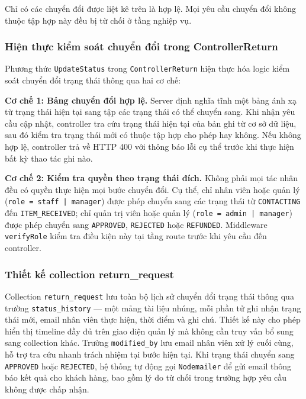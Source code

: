 \documentclass[../DoAn.tex]{subfiles}
\begin{document}
Chỉ có các chuyển đổi được liệt kê trên là hợp lệ. Mọi yêu cầu chuyển đổi
không thuộc tập hợp này đều bị từ chối ở tầng nghiệp vụ.

\subsubsection*{Hiện thực kiểm soát chuyển đổi trong ControllerReturn}
Phương thức \texttt{UpdateStatus} trong \texttt{ControllerReturn} hiện thực
hóa logic kiểm soát chuyển đổi trạng thái thông qua hai cơ chế:

\textbf{Cơ chế 1: Bảng chuyển đổi hợp lệ.} Server định nghĩa tĩnh một bảng
ánh xạ từ trạng thái hiện tại sang tập các trạng thái có thể chuyển sang.
Khi nhận yêu cầu cập nhật, controller tra cứu trạng thái hiện tại của bản ghi
từ cơ sở dữ liệu, sau đó kiểm tra trạng thái mới có thuộc tập hợp cho phép
hay không. Nếu không hợp lệ, controller trả về HTTP 400 với thông báo lỗi cụ
thể trước khi thực hiện bất kỳ thao tác ghi nào.

\textbf{Cơ chế 2: Kiểm tra quyền theo trạng thái đích.} Không phải mọi tác
nhân đều có quyền thực hiện mọi bước chuyển đổi. Cụ thể, chỉ nhân viên hoặc
quản lý \break (\texttt{role = staff | manager}) được phép chuyển sang các trạng thái
từ \break \texttt{CONTACTING} đến \texttt{ITEM\_RECEIVED}; chỉ quản trị viên hoặc
quản lý 
\break (\texttt{role = admin | manager}) được phép chuyển sang \texttt{APPROVED}, \break
\texttt{REJECTED} hoặc \texttt{REFUNDED}. Middleware \texttt{verifyRole} kiểm
tra điều kiện này tại tầng route trước khi yêu cầu đến controller.

\subsubsection*{Thiết kế collection return\_request}

Collection \texttt{return\_request} lưu toàn bộ lịch sử chuyển đổi trạng thái
thông qua trường \texttt{status\_history} --- một mảng tài liệu nhúng, mỗi
phần tử ghi nhận trạng thái mới, email nhân viên thực hiện, thời điểm và ghi
chú. Thiết kế này cho phép hiển thị timeline đầy đủ trên giao diện quản lý mà
không cần truy vấn bổ sung sang collection khác. Trường \texttt{modified\_by}
lưu email nhân viên xử lý cuối cùng, hỗ trợ tra cứu nhanh trách nhiệm tại
bước hiện tại. Khi trạng thái chuyển sang \texttt{APPROVED} hoặc
\texttt{REJECTED}, hệ thống tự động gọi \texttt{Nodemailer} để gửi email thông
báo kết quả cho khách hàng, bao gồm lý do từ chối trong trường hợp yêu cầu
không được chấp nhận.
\end{document}
